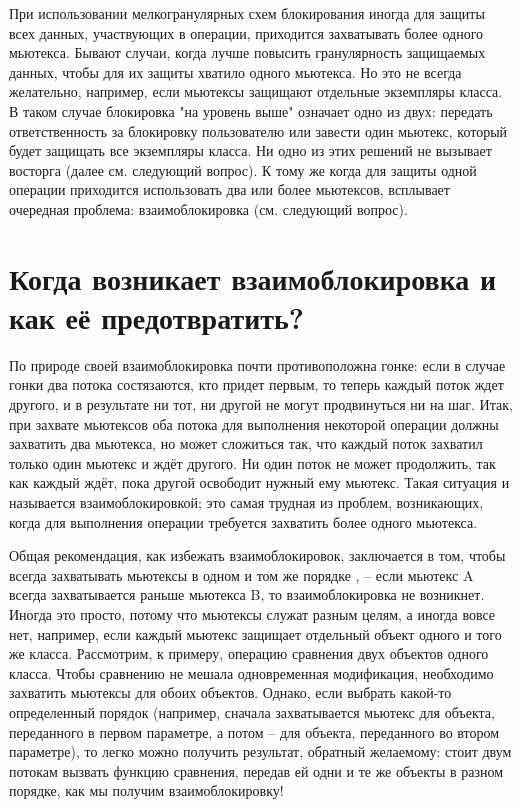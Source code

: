 \documentclass[a4paper,12pt]{article}	%
\begin{document}
	При использовании мелкогранулярных схем блокирования иногда для защиты всех данных, участвующих в операции, приходится захватывать более одного мьютекса. Бывают случаи, когда лучше повысить гранулярность защищаемых данных, чтобы для их защиты хватило одного мьютекса. Но это не всегда желательно, например, если мьютексы защищают отдельные экземпляры класса. В таком случае блокировка "на уровень выше" означает одно из двух: передать ответственность за блокировку пользователю или завести один мьютекс, который будет защищать все экземпляры класса. Ни одно из этих решений не вызывает восторга (далее см. следующий вопрос). К тому же когда для защиты одной операции приходится использовать два или более мьютексов, всплывает очередная проблема: взаимоблокировка (см. следующий вопрос). 

\section{Когда возникает взаимоблокировка и как её предотвратить?}

	По природе своей взаимоблокировка почти противоположна гонке: если в случае гонки два потока состязаются, кто придет первым, то теперь каждый поток ждет другого, и в результате ни тот, ни другой не могут продвинуться ни на шаг. Итак, при захвате мьютексов оба потока для выполнения некоторой операции должны захватить два мьютекса, но может сложиться так, что каждый поток захватил только один мьютекс и ждёт другого. Ни один поток не может продолжить, так как каждый ждёт, пока другой освободит нужный ему мьютекс. Такая ситуация и называется взаимоблокировкой; это самая трудная из проблем, возникающих, когда для выполнения операции требуется захватить более одного мьютекса.
	
	Общая рекомендация, как избежать взаимоблокировок, заключается в том, чтобы всегда захватывать мьютексы в одном и том же порядке , -- если мьютекс A всегда захватывается раньше мьютекса B, то взаимоблокировка не возникнет. Иногда это просто, потому что мьютексы служат разным целям, а иногда вовсе нет, например, если каждый мьютекс защищает отдельный объект одного и того же класса. Рассмотрим, к примеру, операцию сравнения двух объектов одного класса. Чтобы сравнению не мешала одновременная модификация, необходимо захватить мьютексы для обоих объектов. Однако, если выбрать какой-то определенный порядок (например, сначала захватывается мьютекс для объекта, переданного в первом параметре, а потом – для объекта, переданного во втором параметре), то легко можно получить результат, обратный желаемому: стоит двум потокам вызвать функцию сравнения, передав ей одни и те же объекты в разном порядке, как мы получим взаимоблокировку!
	
\end{document}
